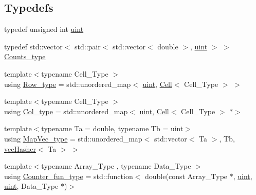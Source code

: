 \subsection*{Typedefs}
\begin{DoxyCompactItemize}
\item 
typedef unsigned int \hyperlink{namespacebarry_a11dfc53ddb4672278319aa04f1e09a6c}{uint}
\item 
typedef std\+::vector$<$ std\+::pair$<$ std\+::vector$<$ double $>$, \hyperlink{namespacebarry_a11dfc53ddb4672278319aa04f1e09a6c}{uint} $>$ $>$ \hyperlink{namespacebarry_a3e2d8c3b6cf602107559d4237d9f1315}{Counts\+\_\+type}
\item 
{\footnotesize template$<$typename Cell\+\_\+\+Type $>$ }\\using \hyperlink{namespacebarry_a8f67f2e1e26f3cb10d240b7e1a1d917c}{Row\+\_\+type} = std\+::unordered\+\_\+map$<$ \hyperlink{namespacebarry_a11dfc53ddb4672278319aa04f1e09a6c}{uint}, \hyperlink{classbarry_1_1_cell}{Cell}$<$ Cell\+\_\+\+Type $>$ $>$
\item 
{\footnotesize template$<$typename Cell\+\_\+\+Type $>$ }\\using \hyperlink{namespacebarry_adc551002e63e38057d304f78d7756308}{Col\+\_\+type} = std\+::unordered\+\_\+map$<$ \hyperlink{namespacebarry_a11dfc53ddb4672278319aa04f1e09a6c}{uint}, \hyperlink{classbarry_1_1_cell}{Cell}$<$ Cell\+\_\+\+Type $>$ $\ast$$>$
\item 
{\footnotesize template$<$typename Ta  = double, typename Tb  = uint$>$ }\\using \hyperlink{namespacebarry_a2f0d3aab1d67e4c8eaeab9022e16139f}{Map\+Vec\+\_\+type} = std\+::unordered\+\_\+map$<$ std\+::vector$<$ Ta $>$, Tb, \hyperlink{structbarry_1_1vec_hasher}{vec\+Hasher}$<$ Ta $>$ $>$
\item 
{\footnotesize template$<$typename Array\+\_\+\+Type , typename Data\+\_\+\+Type $>$ }\\using \hyperlink{namespacebarry_abaaae3200da8e4b7faac3c04fe9c3081}{Counter\+\_\+fun\+\_\+type} = std\+::function$<$ double(const Array\+\_\+\+Type $\ast$, \hyperlink{namespacebarry_a11dfc53ddb4672278319aa04f1e09a6c}{uint}, \hyperlink{namespacebarry_a11dfc53ddb4672278319aa04f1e09a6c}{uint}, Data\+\_\+\+Type $\ast$)$>$
\end{DoxyCompactItemize}
